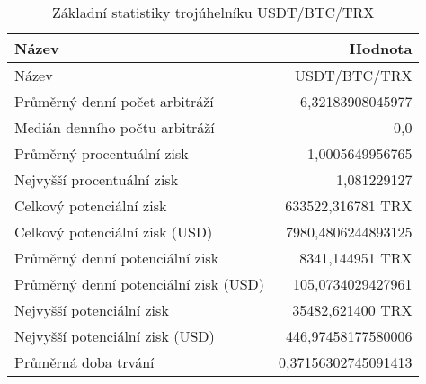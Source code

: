 \begin{table}\centering
\caption{Základní statistiky trojúhelníku USDT/BTC/TRX}
\label{USDTBTCTRX_stats}
\begin{tabular}{|| l | r ||}
\hline Název & Hodnota \\ 
\hline\hline Název & USDT/BTC/TRX \\ 
\hline Průměrný denní počet arbitráží & 6,32183908045977 \\ 
\hline Medián denního počtu arbitráží & 0,0 \\ 
\hline Průměrný procentuální zisk & 1,0005649956765 \\ 
\hline Nejvyšší procentuální zisk & 1,081229127 \\ 
\hline Celkový potenciální zisk & 633522,316781 TRX \\ 
\hline Celkový potenciální zisk (USD) & 7980,4806244893125 \\ 
\hline Průměrný denní potenciální zisk & 8341,144951 TRX \\ 
\hline Průměrný denní potenciální zisk (USD) & 105,0734029427961 \\ 
\hline Nejvyšší potenciální zisk & 35482,621400 TRX \\ 
\hline Nejvyšší potenciální zisk (USD) & 446,97458177580006 \\ 
\hline Průměrná doba trvání & 0,37156302745091413 \\ 
\hline
\end{tabular}
\end{table}